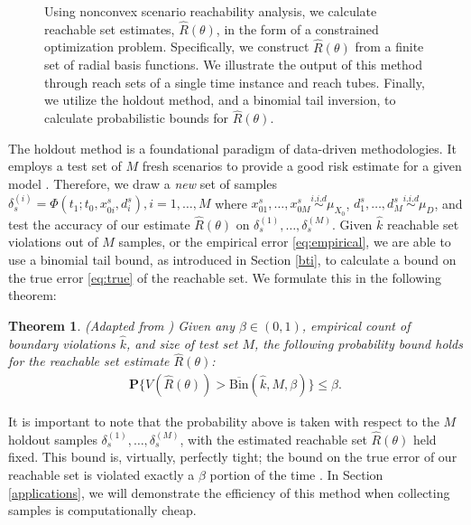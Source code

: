 \documentclass[letterpaper, 10 pt, conference]{ieeeconf}  %
\newtheorem{theorem}{Theorem}
\begin{document}
\begin{figure}[h]
   \centering
    \resizebox{0.9\linewidth}{!}{
        
    } 
   \caption{Using nonconvex scenario reachability analysis, we calculate reachable set estimates, $\hat{R}(\theta)$, in the form of a constrained optimization problem. Specifically, we construct $\hat{R}(\theta)$ from a finite set of radial basis functions. We illustrate the output of this method through reach sets of a single time instance and reach tubes. Finally, we utilize the holdout method, and a binomial tail inversion, to calculate probabilistic bounds for $\hat{R}(\theta)$.}
   \label{overview}
\end{figure}
The holdout method is a foundational paradigm of data-driven methodologies. It 
employs 
a test set of $M$ fresh scenarios 
to provide a good risk estimate for a given model \cite{hardtrecht2022patterns}. Therefore, we draw a \textit{new} set of samples $\delta^{(i)}_s =\Phi(t_1;t_0, x_{0i}^s, d_i^s), i = 1, \dotsc, M $ where $x_{01}^s, \dotsc, x_{0M}^s \overset{i.i.d}{\sim} \mu_{X_0}$, $d_1^s, \dotsc, d_M^s \overset{i.i.d}{\sim} \mu_{D}$, and test the accuracy of our estimate $\hat{R}(\theta)$ on $\delta_s^{(1)}, \dotsc, \delta_s^{(M)}$. 
Given $\hat{k}$ reachable set violations out of $M$ samples, or the empirical error \eqref{eq:empirical}, we are able to use a binomial tail bound, as introduced in Section \ref{bti}, to calculate a bound on the true error \eqref{eq:true} of the reachable set. We formulate this in the following theorem:

\begin{theorem} (\textit{Adapted from \cite[Thm. 3.3]{langford2005tutorial}})
\label{thm:holdout}
Given any $\beta \in (0, 1)$, empirical count of boundary violations $\hat{k}$, and size of test set $M$, the following probability bound holds for the reachable set estimate $\hat{R}(\theta)$: 
\begin{equation}
\begin{aligned}
\label{equ:probviolate}
 {\mathbf{P}} \{ V(\hat{R}(\theta)) > \overline{\text{Bin}}(\hat{k}, M, \beta) \} \leq \beta.
\end{aligned}
\end{equation} 
\end{theorem}
It is important to note that the probability above is taken with respect to the $M$ holdout samples $\delta_s^{(1)}, \dots, \delta_s^{(M)}$, with the estimated reachable set $\hat{R}(\theta)$ held fixed. This bound is, virtually, perfectly tight; the bound on the true error of our reachable set is violated exactly a $\beta$ portion of the time \cite{langford2005tutorial}. In Section \ref{applications}, we will demonstrate the efficiency of this method when collecting samples is computationally cheap. 
\end{document}
